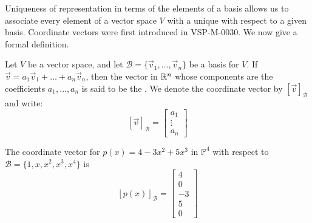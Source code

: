 \documentclass{ximera}
\begin{document}
Uniqueness of representation in terms of the elements of a basis allows us to associate every element of a vector space $V$ with a unique  with respect to a given basis.  Coordinate vectors were first introduced in VSP-M-0030.  We now give a formal definition.

\begin{definition}\label{def:coordvector}
Let $V$ be a vector space, and let $\mathcal{B}=\{\vec{v}_1, \ldots ,\vec{v}_n\}$ be a basis for $V$.  If $\vec{v}=a_1\vec{v}_1+\ldots +a_n\vec{v}_n$, then the vector in $\mathbb{R}^n$ whose components are the coefficients $a_1, \ldots ,a_n$  is said to be the .  We denote the coordinate vector by $[\vec{v}]_{\mathcal{B}}$ and write:
$$[\vec{v}]_{\mathcal{B}}=\begin{bmatrix}a_1\\\vdots \\a_n\end{bmatrix}$$
\end{definition}

\begin{example}
The coordinate vector for $p(x)=4-3x^2+5x^3$ in $\mathbb{P}^4$ with respect to $\mathcal{B}=\{1, x, x^2, x^3, x^4\}$ is 
$$[p(x)]_{\mathcal{B}}=\begin{bmatrix}4\\0\\-3\\5\\0\end{bmatrix}$$
\end{example}
\end{document}
